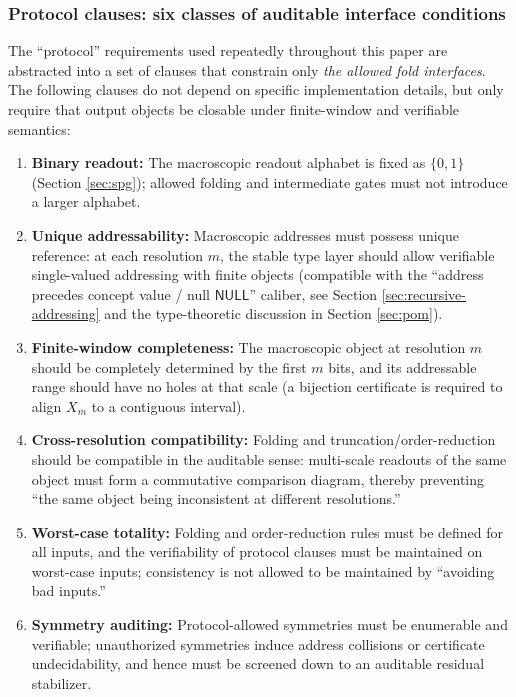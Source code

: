 \subsubsection{Protocol clauses: six classes of auditable interface conditions}
The ``protocol'' requirements used repeatedly throughout this paper are abstracted into a set of clauses that constrain only \emph{the allowed fold interfaces}. The following clauses do not depend on specific implementation details, but only require that output objects be closable under finite-window and verifiable semantics:
\begin{enumerate}
  \item[\textbf{(P1)}] \textbf{Binary readout:} The macroscopic readout alphabet is fixed as \(\{0,1\}\) (Section \ref{sec:spg}); allowed folding and intermediate gates must not introduce a larger alphabet.
  \item[\textbf{(P2)}] \textbf{Unique addressability:} Macroscopic addresses must possess unique reference: at each resolution \(m\), the stable type layer should allow verifiable single-valued addressing with finite objects (compatible with the ``address precedes concept value / null \(\mathsf{NULL}\)'' caliber, see Section \ref{sec:recursive-addressing} and the type-theoretic discussion in Section \ref{sec:pom}).
  \item[\textbf{(P3)}] \textbf{Finite-window completeness:} The macroscopic object at resolution \(m\) should be completely determined by the first \(m\) bits, and its addressable range should have no holes at that scale (a bijection certificate is required to align \(X_m\) to a contiguous interval).
  \item[\textbf{(P4)}] \textbf{Cross-resolution compatibility:} Folding and truncation/order-reduction should be compatible in the auditable sense: multi-scale readouts of the same object must form a commutative comparison diagram, thereby preventing ``the same object being inconsistent at different resolutions.''
  \item[\textbf{(P5)}] \textbf{Worst-case totality:} Folding and order-reduction rules must be defined for all inputs, and the verifiability of protocol clauses must be maintained on worst-case inputs; consistency is not allowed to be maintained by ``avoiding bad inputs.''
  \item[\textbf{(P6)}] \textbf{Symmetry auditing:} Protocol-allowed symmetries must be enumerable and verifiable; unauthorized symmetries induce address collisions or certificate undecidability, and hence must be screened down to an auditable residual stabilizer.
\end{enumerate}

